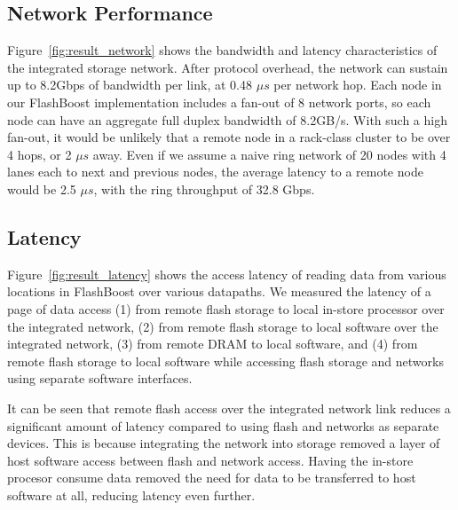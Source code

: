 \subsection{Network Performance}

Figure~\ref{fig:result_network} shows the bandwidth and latency characteristics
of the integrated storage network. After protocol overhead, the network can
sustain up to 8.2Gbps of bandwidth per link, at 0.48 $\mu s$ per network hop.
Each node in our FlashBoost implementation includes a fan-out of 8 network
ports, so each node can have an aggregate full duplex bandwidth of 8.2GB/s. With
such a high fan-out, it would be unlikely that a remote node in a rack-class
cluster to be over 4 hops, or 2 $\mu s$ away. Even if we assume a naive ring
network of 20 nodes with 4 lanes each to next and previous nodes, the average
latency to a remote node would be 2.5 $\mu s$, with the ring throughput of 32.8
Gbps.


\subsection{Latency}

Figure~\ref{fig:result_latency} shows the access latency of reading data from
various locations in FlashBoost over various datapaths. We measured the latency of
a page of data access (1) from remote flash storage to local in-store processor
over the integrated network, (2) from remote flash storage to local software
over the integrated network, (3) from remote DRAM to local software, and (4)
from remote flash storage to local software while accessing flash storage and
networks using separate software interfaces.

It can be seen that remote flash access over the integrated network link reduces
a significant amount of latency compared to using flash and networks as separate
devices. This is because integrating the network into storage removed a layer of
host software access between flash and network access. Having the in-store
procesor consume data removed the need for data to be transferred to host
software at all, reducing latency even further.


